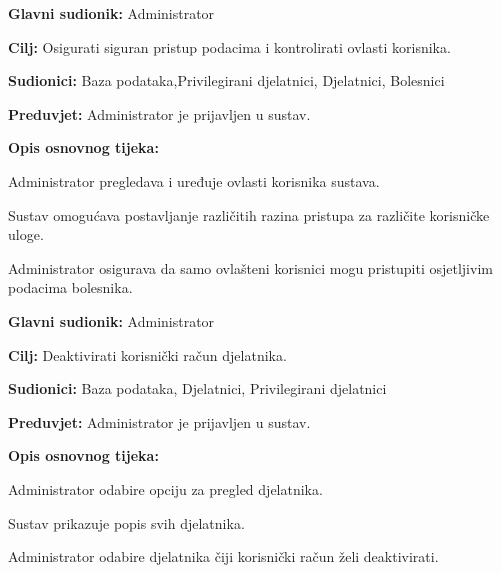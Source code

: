 \vspace{1em} %
\noindent{}
\begin{packed_item}
	\item \textbf{Glavni sudionik:} Administrator
	\item \textbf{Cilj:} Osigurati siguran pristup podacima i kontrolirati ovlasti korisnika.
	\item \textbf{Sudionici:} Baza podataka,Privilegirani djelatnici, Djelatnici, Bolesnici
	\item \textbf{Preduvjet:} Administrator je prijavljen u sustav.
	\item \textbf{Opis osnovnog tijeka:}
	\begin{packed_enum}
		\item Administrator pregledava i uređuje ovlasti korisnika sustava.
		\item Sustav omogućava postavljanje različitih razina pristupa za različite korisničke uloge.
		\item Administrator osigurava da samo ovlašteni korisnici mogu pristupiti osjetljivim podacima bolesnika.
	\end{packed_enum}
\end{packed_item}

\vspace{1em} %
\noindent{}
\begin{packed_item}
	\item \textbf{Glavni sudionik:} Administrator
	\item \textbf{Cilj:} Deaktivirati korisnički račun djelatnika.
	\item \textbf{Sudionici:} Baza podataka, Djelatnici, Privilegirani djelatnici
	\item \textbf{Preduvjet:} Administrator je prijavljen u sustav.
	\item \textbf{Opis osnovnog tijeka:}
	\begin{packed_enum}
		\item Administrator odabire opciju za pregled djelatnika.
		\item Sustav prikazuje popis svih djelatnika.
		\item Administrator odabire djelatnika čiji korisnički račun želi deaktivirati.
	\end{packed_enum}
\end{packed_item}

